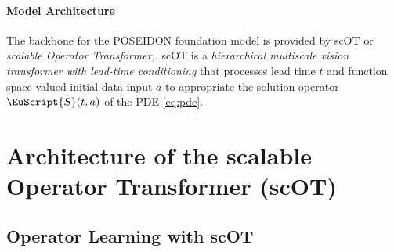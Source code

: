 \documentclass[reqno,10pt]{amsart}
\theoremstyle{plain}
\theoremstyle{definition}
\newcommand{\eus}[1]{\EuScript{#1}}
\begin{document}
\paragraph{\bf Model Architecture} The backbone for the {\large P}OSEIDON foundation model is provided by scOT or {\it scalable Operator Transformer,}. scOT is a {\it hierarchical multiscale vision transformer with lead-time conditioning} that processes lead time $t$ and function space valued initial data input $a$ to appropriate the solution operator $\eus S(t,a)$ of the PDE \ref{eq:pde}.

\appendix
\section{\bf Architecture of the scalable Operator Transformer (scOT)}
\subsection{Operator Learning with scOT}














\end{document}
